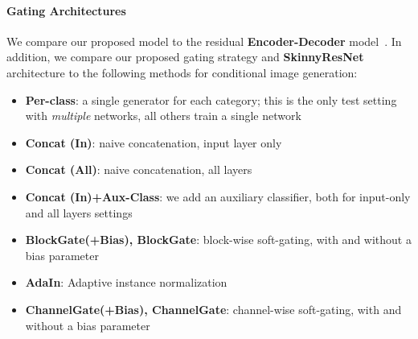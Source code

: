 \paragraph{Gating Architectures}
We compare our proposed model to the residual \textbf{Encoder-Decoder} model~\cite{huang2018multimodal}.
In addition, we compare our proposed gating strategy and {\bf SkinnyResNet} architecture to the following methods for  conditional image generation:

\begin{itemize}[noitemsep,leftmargin=12pt]
\item{\bf Per-class}: a single generator for each category; this is the only test setting with \textit{multiple} networks, all others train a single network
\item{\bf Concat (In)}: naive concatenation, input layer only
\item{\bf Concat (All)}: naive concatenation, all layers
\item{\bf Concat (In)+Aux-Class}: we add an auxiliary classifier, both for input-only and all layers settings
\item{\bf BlockGate(+Bias), BlockGate}: block-wise soft-gating, with and without a bias parameter
\item{\bf AdaIn}: Adaptive instance normalization
\item{\bf ChannelGate(+Bias), ChannelGate}: channel-wise soft-gating, with and without a bias parameter
\end{itemize}
\vspace{-2mm}

